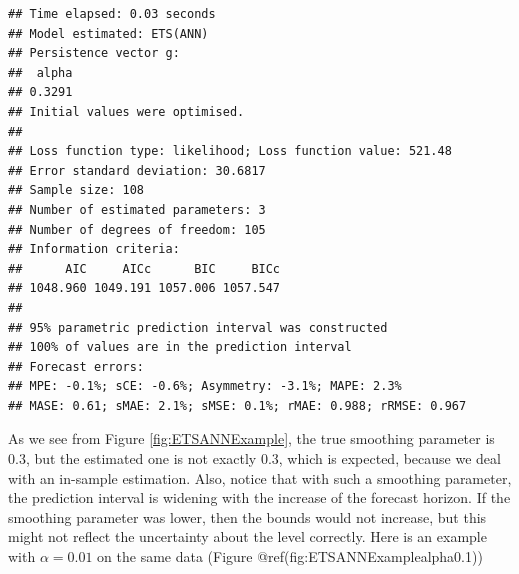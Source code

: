 \documentclass[
]{book}
\newenvironment{Shaded}{\begin{snugshade}}{\end{snugshade}}
\newcommand{\AttributeTok}[1]{\textcolor[rgb]{0.77,0.63,0.00}{#1}}
\newcommand{\ConstantTok}[1]{\textcolor[rgb]{0.00,0.00,0.00}{#1}}
\newcommand{\DecValTok}[1]{\textcolor[rgb]{0.00,0.00,0.81}{#1}}
\newcommand{\FloatTok}[1]{\textcolor[rgb]{0.00,0.00,0.81}{#1}}
\newcommand{\FunctionTok}[1]{\textcolor[rgb]{0.00,0.00,0.00}{#1}}
\newcommand{\NormalTok}[1]{#1}
\newcommand{\OtherTok}[1]{\textcolor[rgb]{0.56,0.35,0.01}{#1}}
\newcommand{\SpecialCharTok}[1]{\textcolor[rgb]{0.00,0.00,0.00}{#1}}
\newcommand{\StringTok}[1]{\textcolor[rgb]{0.31,0.60,0.02}{#1}}
\theoremstyle{definition}
\theoremstyle{definition}
\theoremstyle{definition}
\theoremstyle{definition}
\theoremstyle{remark}
\begin{document}
\begin{verbatim}
## Time elapsed: 0.03 seconds
## Model estimated: ETS(ANN)
## Persistence vector g:
##  alpha 
## 0.3291 
## Initial values were optimised.
## 
## Loss function type: likelihood; Loss function value: 521.48
## Error standard deviation: 30.6817
## Sample size: 108
## Number of estimated parameters: 3
## Number of degrees of freedom: 105
## Information criteria:
##      AIC     AICc      BIC     BICc 
## 1048.960 1049.191 1057.006 1057.547 
## 
## 95% parametric prediction interval was constructed
## 100% of values are in the prediction interval
## Forecast errors:
## MPE: -0.1%; sCE: -0.6%; Asymmetry: -3.1%; MAPE: 2.3%
## MASE: 0.61; sMAE: 2.1%; sMSE: 0.1%; rMAE: 0.988; rRMSE: 0.967
\end{verbatim}

As we see from Figure \ref{fig:ETSANNExample}, the true smoothing parameter is 0.3, but the estimated one is not exactly 0.3, which is expected, because we deal with an in-sample estimation. Also, notice that with such a smoothing parameter, the prediction interval is widening with the increase of the forecast horizon. If the smoothing parameter was lower, then the bounds would not increase, but this might not reflect the uncertainty about the level correctly. Here is an example with \(\alpha=0.01\) on the same data (Figure @ref(fig:ETSANNExamplealpha0.1))

\begin{Shaded}
\end{Shaded}
\end{document}
